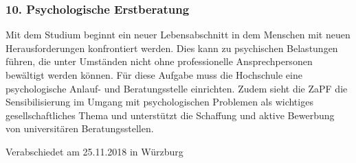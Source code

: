 \documentclass[DIV=calc]{scrartcl}
\begin{document}
\hypertarget{psychologische-erstberatung}{%
\subsubsection*{10. Psychologische Erstberatung}\label{psychologische-erstberatung}}

Mit dem Studium beginnt ein neuer Lebensabschnitt in dem Menschen mit neuen Herausforderungen konfrontiert werden. Dies kann zu psychischen Belastungen führen, die unter Umständen nicht ohne professionelle Ansprechpersonen bewältigt werden können. Für diese Aufgabe muss die Hochschule eine psychologische Anlauf- und Beratungsstelle einrichten. Zudem sieht die ZaPF die Sensibilisierung im Umgang mit psychologischen Problemen als wichtiges gesellschaftliches Thema und unterstützt die Schaffung und aktive Bewerbung von universitären Beratungsstellen.
\vfill
    \begin{flushright}
        Verabschiedet am 25.11.2018 in Würzburg
    \end{flushright}
\end{document}
